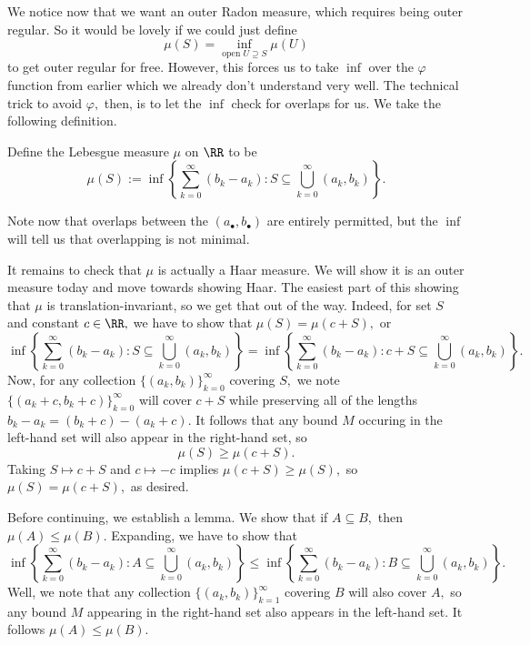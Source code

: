 We notice now that we want an outer Radon measure, which requires being outer regular. So it would be lovely if we could just define
\[\mu(S)=\inf_{\text{open }U\supseteq S}\mu(U)\]
to get outer regular for free. However, this forces us to take $\inf$ over the $\varphi$ function from earlier which we already don't understand very well. The technical trick to avoid $\varphi,$ then, is to let the $\inf$ check for overlaps for us. We take the following definition.
\begin{definition}
    Define the Lebesgue measure $\mu$ on $\RR$ to be
    \[\mu(S):=\inf\left\{\sum_{k=0}^\infty(b_k-a_k):S\subseteq\bigcup_{k=0}^\infty(a_k,b_k)\right\}.\]
\end{definition}
Note now that overlaps between the $(a_\bullet,b_\bullet)$ are entirely permitted, but the $\inf$ will tell us that overlapping is not minimal.

It remains to check that $\mu$ is actually a Haar measure. We will show it is an outer measure today and move towards showing Haar. The easiest part of this showing that $\mu$ is translation-invariant, so we get that out of the way. Indeed, for set $S$ and constant $c\in\RR,$ we have to show that $\mu(S)=\mu(c+S),$ or
\[\inf\left\{\sum_{k=0}^\infty(b_k-a_k):S\subseteq\bigcup_{k=0}^\infty(a_k,b_k)\right\}=\inf\left\{\sum_{k=0}^\infty(b_k-a_k):c+S\subseteq\bigcup_{k=0}^\infty(a_k,b_k)\right\}.\]
Now, for any collection $\{(a_k,b_k)\}_{k=0}^\infty$ covering $S,$ we note $\{(a_k+c,b_k+c)\}_{k=0}^\infty$ will cover $c+S$ while preserving all of the lengths $b_k-a_k=(b_k+c)-(a_k+c).$ It follows that any bound $M$ occuring in the left-hand set will also appear in the right-hand set, so
\[\mu(S)\ge\mu(c+S).\]
Taking $S\mapsto c+S$ and $c\mapsto-c$ implies $\mu(c+S)\ge\mu(S),$ so $\mu(S)=\mu(c+S),$ as desired.

Before continuing, we establish a lemma. We show that if $A\subseteq B,$ then $\mu(A)\le\mu(B).$ Expanding, we have to show that
\[\inf\left\{\sum_{k=0}^\infty(b_k-a_k):A\subseteq\bigcup_{k=0}^\infty(a_k,b_k)\right\}\le\inf\left\{\sum_{k=0}^\infty(b_k-a_k):B\subseteq\bigcup_{k=0}^\infty(a_k,b_k)\right\}.\]
Well, we note that any collection $\{(a_k,b_k)\}_{k=1}^\infty$ covering $B$ will also cover $A,$ so any bound $M$ appearing in the right-hand set also appears in the left-hand set. It follows $\mu(A)\le\mu(B).$


